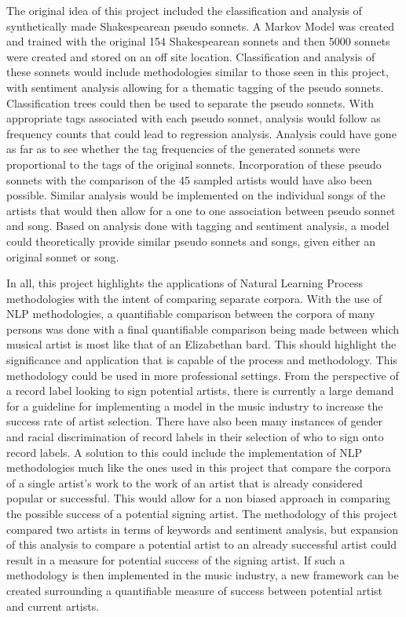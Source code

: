 \documentclass[10pt,a4paper]{article}
\begin{document}
\noindent The original idea of this project included the classification and analysis of synthetically made Shakespearean pseudo sonnets. A Markov Model was created and trained with the original 154 Shakespearean sonnets and then 5000 sonnets were created and stored on an off site location. Classification and analysis of these sonnets would include methodologies similar to those seen in this project, with sentiment analysis allowing for a thematic tagging of the pseudo sonnets. Classification trees could then be used to separate the pseudo sonnets. With appropriate tags associated with each pseudo sonnet, analysis would follow as frequency counts that could lead to regression analysis. Analysis could have gone as far as to see whether the tag frequencies of the generated sonnets were proportional to the tags of the original sonnets. Incorporation of these pseudo sonnets with the comparison of the 45 sampled artists would have also been possible. Similar analysis would be implemented on the individual songs of the artists that would then allow for a one to one association between pseudo sonnet and song. Based on analysis done with tagging and sentiment analysis, a model could theoretically provide similar pseudo sonnets and songs, given either an original sonnet or song.

\noindent In all, this project highlights the applications of Natural Learning Process methodologies with the intent of comparing separate corpora. With the use of NLP methodologies, a quantifiable comparison between the corpora of many persons was done with a final quantifiable comparison being made between which musical artist is most like that of an Elizabethan bard. This should highlight the significance and application that is capable of the process and methodology. This methodology could be used in more professional settings. From the perspective of a record label looking to sign potential artists, there is currently a large demand for a guideline for implementing a model in the music industry to increase the success rate of artist selection\cite{bio-article1}. There have also been many instances of gender and racial discrimination of record labels in their selection of who to sign onto record labels\cite{bio-article1}. A solution to this could include the implementation of NLP methodologies much like the ones used in this project that compare the corpora of a single artist's work to the work of an artist that is already considered popular or successful. This would allow for a non biased approach in comparing the possible success of a potential signing artist. The methodology of this project compared two artists in terms of keywords and sentiment analysis, but expansion of this analysis to compare a potential artist to an already successful artist could result in a measure for potential success of the signing artist. If such a methodology is then implemented in the music industry, a new framework can be created surrounding a quantifiable measure of success between potential artist and current artists. 
\end{document}
